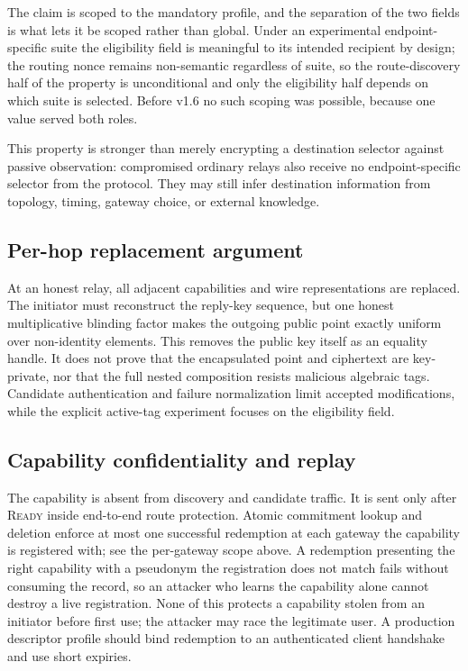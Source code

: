 \documentclass[11pt,oneside]{article}
\begin{document}
The claim is scoped to the mandatory profile, and the separation of the two fields is what lets it be scoped rather than global. Under an experimental endpoint-specific suite the eligibility field is meaningful to its intended recipient by design; the routing nonce remains non-semantic regardless of suite, so the route-discovery half of the property is unconditional and only the eligibility half depends on which suite is selected. Before v1.6 no such scoping was possible, because one value served both roles.

This property is stronger than merely encrypting a destination selector against passive observation: compromised ordinary relays also receive no endpoint-specific selector from the protocol. They may still infer destination information from topology, timing, gateway choice, or external knowledge.

\subsection{Per-hop replacement argument}

At an honest relay, all adjacent capabilities and wire representations are replaced. The initiator must reconstruct the reply-key sequence, but one honest multiplicative blinding factor makes the outgoing public point exactly uniform over non-identity elements. This removes the public key itself as an equality handle. It does not prove that the encapsulated point and ciphertext are key-private, nor that the full nested composition resists malicious algebraic tags. Candidate authentication and failure normalization limit accepted modifications, while the explicit active-tag experiment focuses on the eligibility field.

\subsection{Capability confidentiality and replay}

The capability is absent from discovery and candidate traffic. It is sent only after \textsc{Ready} inside end-to-end route protection. Atomic commitment lookup and deletion enforce at most one successful redemption at each gateway the capability is registered with; see the per-gateway scope above. A redemption presenting the right capability with a pseudonym the registration does not match fails without consuming the record, so an attacker who learns the capability alone cannot destroy a live registration. None of this protects a capability stolen from an initiator before first use; the attacker may race the legitimate user. A production descriptor profile should bind redemption to an authenticated client handshake and use short expiries.
\end{document}
